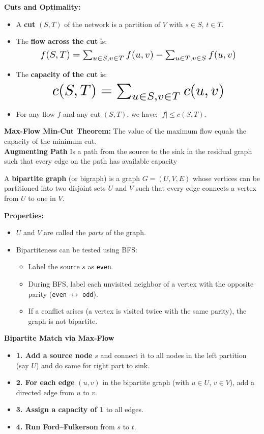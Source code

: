 \documentclass[a4paper,landscape]{article}
\begin{document}
\begin{multicols}{7}
\textbf{Cuts and Optimality:}
\begin{itemize}[noitemsep, topsep=0pt]
    \item A \textbf{cut} $(S, T)$ of the network is a partition of $V$ with $s \in S$, $t \in T$.
    
    \item The \textbf{flow across the cut} is:
    \[
    \resizebox{0.8\textwidth}{!}{$
    f(S, T) = \sum_{u \in S, v \in T} f(u, v) - \sum_{u \in T, v \in S} f(u, v)
    $}
    \]
    
    \item The \textbf{capacity of the cut} is:
    \[
    \resizebox{0.7\textwidth}{!}{$
    c(S, T) = \sum_{u \in S, v \in T} c(u, v)
    $}
    \]
    
    \item For any flow $f$ and any cut $(S, T)$, we have: $|f| \leq c(S, T)$.
\end{itemize}


\textbf{Max-Flow Min-Cut Theorem:} The value of the maximum flow equals the capacity of the minimum cut.\\
\textbf{Augmenting Path}
Is a path from the source to the sink in the residual graph such that every edge on the path has available capacity
\endtcolorbox

\tcolorbox[mybox={Bipartite Graphs}]
A \textbf{bipartite graph} (or bigraph) is a graph $G = (U, V, E)$ whose vertices can be partitioned into two disjoint sets $U$ and $V$ such that every edge connects a vertex from $U$ to one in $V$.

\textbf{Properties:}
\begin{itemize}[noitemsep, topsep=0pt]
    \item $U$ and $V$ are called the \textit{parts} of the graph.
    \item Bipartiteness can be tested using BFS:
    \begin{itemize}[noitemsep, topsep=0pt]
        \item Label the source $s$ as \texttt{even}.
        \item During BFS, label each unvisited neighbor of a vertex with the opposite parity (\texttt{even} $\leftrightarrow$ \texttt{odd}).
        \item If a conflict arises (a vertex is visited twice with the same parity), the graph is not bipartite.
    \end{itemize}
\end{itemize}
 \textbf{Bipartite Match via Max-Flow}
\begin{itemize}
  \item \textbf{1. Add a source node} $s$ and connect it to all nodes in the left partition (say $U$) and do same for right part to sink.
  \item \textbf{2. For each edge} $(u, v)$ in the bipartite graph (with $u \in U$, $v \in V$), add a directed edge from $u$ to $v$.
  \item \textbf{3. Assign a capacity of 1} to all edges.
  \item \textbf{4. Run Ford–Fulkerson} from $s$ to $t$.
\end{itemize}
\endtcolorbox


\end{multicols}
\end{document}
